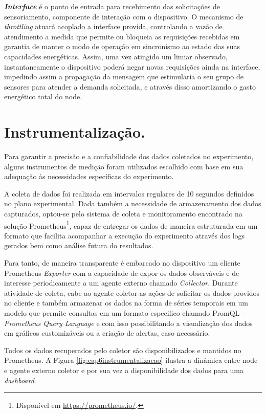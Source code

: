 \textbf{\textit{Interface}} é o ponto de entrada para recebimento das solicitações de sensoriamento, componente de interação com o dispositivo. O mecanismo de \textit{throttling} atuará acoplado a interface provida, controlando a vazão de atendimento a medida que permite ou bloqueia as requisições recebidas em garantia de manter o modo de operação em sincronismo ao estado das suas capacidades energéticas. Assim, uma vez atingido um limiar observado, instantaneamente o dispositivo poderá negar novas requisições ainda na interface, impedindo assim a propagação da mensagem que estimularia o seu grupo de sensores para atender a demanda solicitada, e através disso amortizando o gasto energético total do node.




\section{Instrumentalização.}
\label{cap6:instrumentalizacao}
Para garantir a precisão e a confiabilidade dos dados coletados no experimento, alguns instrumentos de medição foram utilizados escolhido com base em sua adequação às necessidades específicas do experimento. 

A coleta de dados foi realizada em intervalos regulares de 10 segundos definidos no plano experimental. Dada também a necessidade de armazenamento dos dados capturados, optou-se pelo sistema de coleta e monitoramento encontrado na solução Prometheus\footnote{Disponível em \url{https://prometheus.io/}.}, capaz de entregar os dados de maneira estruturada em um formato que facilita acompanhar a execução do experimento através dos logs gerados bem como análise futura do resultados. 

Para tanto, de maneira transparente é embarcado no dispositivo um cliente Prometheus \textit{Exporter} com a capacidade de expor os dados observáveis e de interesse periodicamente a um agente externo chamado \textit{Collector}. Durante atividade de coleta, cabe ao agente coletor as ações de solicitar os dados providos no cliente e também armazenar os dados na forma de séries temporais em um modelo que permite consultas em um formato especifico chamado PromQL - \textit{Prometheus Query Language} e com isso possibilitando a visualização dos dados em gráficos customizáveis ou a criação de alertas, caso necessário.

Todos os dados recuperados pelo coletor são disponibilizados e mantidos no Prometheus. A Figura \ref{fig:cap6instrumentalizacao} ilustra a dinâmica entre node e agente externo coletor e por sua vez a disponibilidade dos dados para uma \textit{dashboard}. 

